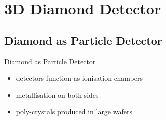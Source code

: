 \section{3D Diamond Detector}
\subsection{Diamond as Particle Detector}
\begin{frame}{Diamond as Particle Detector}

	
	\begin{itemize}\itemfill
		\item detectors function as ionisation chambers 
		\item metallisation on both sides
		\item poly-crystals produced in large wafers
	\end{itemize}

\end{frame}

